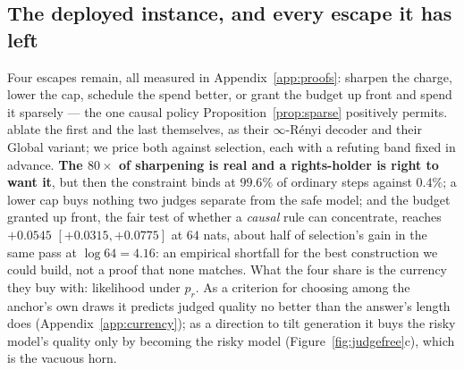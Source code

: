 
\subsection{The deployed instance, and every escape it has left}\label{sec:orders}





Four escapes remain, all measured in Appendix~\ref{app:proofs}: sharpen the charge, lower the cap,
schedule the spend better, or grant the budget up front and spend it sparsely --- the one causal policy
Proposition~\ref{prop:sparse} positively permits. \citet{he2026anchored} ablate the first and the
last themselves, as their $\infty$-R\'enyi decoder and their Global variant; we price both against
selection, each with a refuting band fixed in advance. \textbf{The $80\times$ of sharpening is real
and a rights-holder is right to want it}, but then the constraint binds at $99.6\%$ of ordinary
steps against $0.4\%$; a lower cap buys nothing two judges separate from the safe model; and the
budget granted up front, the fair test of whether a \emph{causal} rule can concentrate, reaches
$+0.0545$ $[+0.0315, +0.0775]$ at $64$ nats, about half of selection's gain in the same pass at
$\log 64 = 4.16$: an empirical shortfall for the best construction we could build, not a proof that
none matches. What the four share is the currency they buy with: likelihood under $p_r$. As a criterion for
choosing among the anchor's own draws it predicts judged quality no better than the answer's length
does (Appendix~\ref{app:currency}); as a direction to tilt generation it buys the risky model's
quality only by becoming the risky model (Figure~\ref{fig:judgefree}c), which is the vacuous horn.
